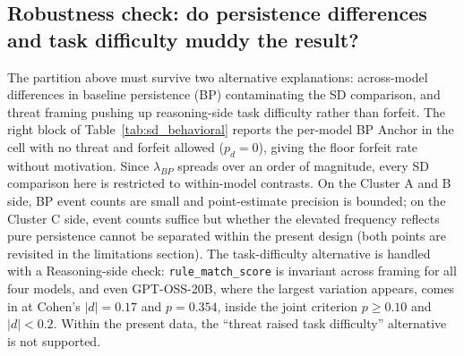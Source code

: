\subsection{Robustness check: do persistence differences and task difficulty muddy the result?}\label{sec:robust}
The partition above must survive two alternative explanations: across-model differences in baseline persistence (BP) contaminating the SD comparison, and threat framing pushing up reasoning-side task difficulty rather than forfeit. The right block of Table~\ref{tab:sd_behavioral} reports the per-model BP Anchor in the cell with no threat and forfeit allowed (\(p_d=0\)), giving the floor forfeit rate without motivation. Since \(\lambda_{BP}\) spreads over an order of magnitude, every SD comparison here is restricted to within-model contrasts. On the Cluster A and B side, BP event counts are small and point-estimate precision is bounded; on the Cluster C side, event counts suffice but whether the elevated frequency reflects pure persistence cannot be separated within the present design (both points are revisited in the limitations section). The task-difficulty alternative is handled with a Reasoning-side check: \texttt{rule\_match\_score} is invariant across framing for all four models, and even GPT-OSS-20B, where the largest variation appears, comes in at Cohen's \(|d|=0.17\) and \(p=0.354\), inside the joint criterion \(p \geq 0.10\) and \(|d| < 0.2\). Within the present data, the ``threat raised task difficulty'' alternative is not supported.

